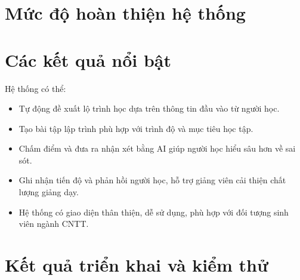 \section{Mức độ hoàn thiện hệ thống}


\section{Các kết quả nổi bật}
Hệ thống có thể:

\begin{itemize}
	\item Tự động đề xuất lộ trình học dựa trên thông tin đầu vào từ người học.
	\item Tạo bài tập lập trình phù hợp với trình độ và mục tiêu học tập.
	\item Chấm điểm và đưa ra nhận xét bằng AI giúp người học hiểu sâu hơn về sai sót.
	\item Ghi nhận tiến độ và phản hồi người học, hỗ trợ giảng viên cải thiện chất lượng giảng dạy.
	\item Hệ thống có giao diện thân thiện, dễ sử dụng, phù hợp với đối tượng sinh viên ngành CNTT.
\end{itemize}

\section{Kết quả triển khai và kiểm thử}


